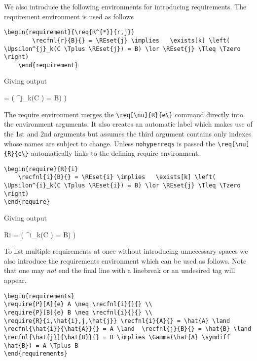 \documentclass[leqno,11pt]{amsart}
\begin{document}
We also introduce the following environments for introducing requirements.  The requirement environment is used as follows

\begin{lstlisting}[breaklines]
	\begin{requirement}{\req{R^{*}}{r,j}}
		\recfnl{r}{B}{} = \REset{j} \implies   \exists[k] \left( \Upsilon^{j}_k(C \Tplus \REset{j}) = B) \lor \REset{j} \Tleq \Tzero \right) 
	\end{requirement}
\end{lstlisting}

Giving output 

	\begin{requirement}{}
		 =  \implies   \exists[k] \left( \Upsilon^{j}_k(C \Tplus {}) = B) \lor {} \Tleq \Tzero \right) 
	\end{requirement}

The require environment merges the \verb=\req[\nu]{R}{e\}= command directly into the environment arguments.  It also creates an automatic label which makes use of the 1st and 2nd arguments but assumes the third argument contains only indexes whose names are subject to change.  Unless \verb=nohyperreqs= is passed the \verb=\req[\nu]{R}{e\}= automatically links to the defining require environment.

\begin{lstlisting}[breaklines]
\begin{require}{R}{i}
	\recfnl{i}{B}{} = \REset{i} \implies   \exists[k] \left( \Upsilon^{i}_k(C \Tplus \REset{i}) = B) \lor \REset{j} \Tleq \Tzero \right)
\end{require}
\end{lstlisting}

 Giving output 

\begin{require}{R}{i}
	 =  \implies   \exists[k] \left( \Upsilon^{i}_k(C \Tplus {}) = B) \lor {} \Tleq \Tzero \right)
\end{require}

To list multiple requirements at once without introducing unnecessary spaces we also introduce the requirements environment which can be used as follows.  Note that one may \textit{not} end the final line with a linebreak or an undesired tag will appear.

\begin{lstlisting}[breaklines]
\begin{requirements}
\require{P}[A]{e} A \neq \recfnl{i}{}{} \\
\require{P}[B]{e} B \neq \recfnl{i}{}{} \\
\require{R}{i,\hat{i},j,\hat{j}} \recfnl{i}{A}{} = \hat{A} \land \recfnl{\hat{i}}{\hat{A}}{} = A \land  \recfnl{j}{B}{} = \hat{B} \land \recfnl{\hat{j}}{\hat{B}}{} = B \implies \Gamma(\hat{A} \symdiff \hat{B}) = A \Tplus B 
\end{requirements}
\end{lstlisting}
\end{document}

